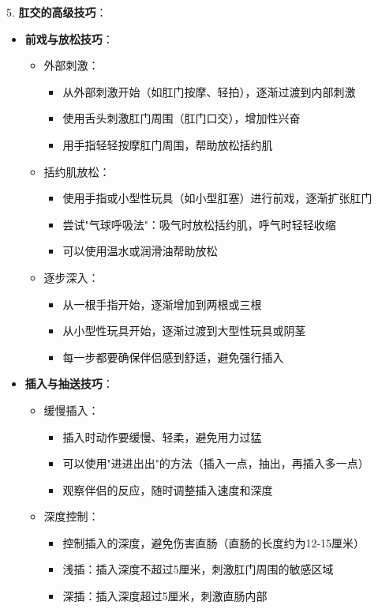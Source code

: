 \documentclass[12pt,UTF8]{ctexbook}
\begin{document}
5. \textbf{肛交的高级技巧}：
\begin{itemize}
	\item \textbf{前戏与放松技巧}：
	\begin{itemize}
		\item 外部刺激：
		\begin{itemize}
			\item 从外部刺激开始（如肛门按摩、轻拍），逐渐过渡到内部刺激
			\item 使用舌头刺激肛门周围（肛门口交），增加性兴奋
			\item 用手指轻轻按摩肛门周围，帮助放松括约肌
		\end{itemize}
		\item 括约肌放松：
		\begin{itemize}
			\item 使用手指或小型性玩具（如小型肛塞）进行前戏，逐渐扩张肛门
			\item 尝试"气球呼吸法"：吸气时放松括约肌，呼气时轻轻收缩
			\item 可以使用温水或润滑油帮助放松
		\end{itemize}
		\item 逐步深入：
		\begin{itemize}
			\item 从一根手指开始，逐渐增加到两根或三根
			\item 从小型性玩具开始，逐渐过渡到大型性玩具或阴茎
			\item 每一步都要确保伴侣感到舒适，避免强行插入
		\end{itemize}
	\end{itemize}
	\item \textbf{插入与抽送技巧}：
	\begin{itemize}
		\item 缓慢插入：
		\begin{itemize}
			\item 插入时动作要缓慢、轻柔，避免用力过猛
			\item 可以使用"进进出出"的方法（插入一点，抽出，再插入多一点）
			\item 观察伴侣的反应，随时调整插入速度和深度
		\end{itemize}
		\item 深度控制：
		\begin{itemize}
			\item 控制插入的深度，避免伤害直肠（直肠的长度约为12-15厘米）
			\item 浅插：插入深度不超过5厘米，刺激肛门周围的敏感区域
			\item 深插：插入深度超过5厘米，刺激直肠内部

\end{itemize}
\end{itemize}
\end{itemize}
\end{document}
